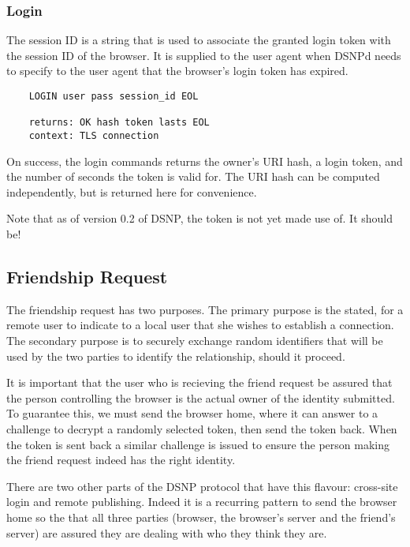 \documentclass[letterpaper,11pt,oneside]{article}
\begin{document}
\subsubsection{Login}

The session ID is a string that is used to associate the granted login token
with the session ID of the browser. It is supplied to the user agent when DSNPd
needs to specify to the user agent that the browser's login token has expired.

\vspace{10pt}
\begin{verbatim}
    LOGIN user pass session_id EOL

    returns: OK hash token lasts EOL
    context: TLS connection
\end{verbatim}
\vspace{10pt}

On success, the login commands returns the owner's URI hash, a login token, and
the number of seconds the token is valid for. The URI hash can be computed
independently, but is returned here for convenience.

Note that as of version 0.2 of DSNP, the token is not yet made use of. It
should be!

\subsection{Friendship Request}

The friendship request has two purposes. The primary purpose is the stated, for
a remote user to indicate to a local user that she wishes to establish a
connection. The secondary purpose is to securely exchange random identifiers
that will be used by the two parties to identify the relationship, should it
proceed.

It is important that the user who is recieving the friend request be assured
that the person controlling the browser is the actual owner of the identity
submitted. To guarantee this, we must send the browser home, where it can
answer to a challenge to decrypt a randomly selected token, then send the token
back. When the token is sent back a similar challenge is issued to ensure the
person making the friend request indeed has the right identity.

There are two other parts of the DSNP protocol that have this flavour:
cross-site login and remote publishing. Indeed it is a recurring pattern to
send the browser home so the that all three parties (browser, the browser's
server and the friend's server) are assured they are dealing with who they
think they are.
\end{document}
